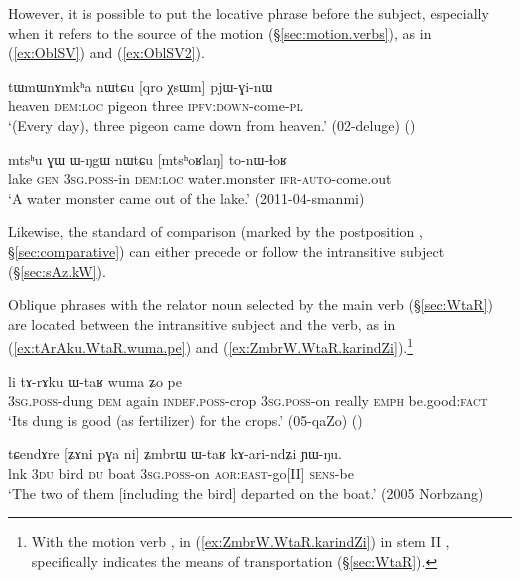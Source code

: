 However, it is possible to put the locative phrase before the subject, especially when it refers to the source of the motion (§\ref{sec:motion.verbs}), as in (\ref{ex:OblSV}) and (\ref{ex:OblSV2}).

\begin{exe}
\ex \label{ex:OblSV}
\gll tɯmɯnɤmkʰa nɯtɕu [qro χsɯm] pjɯ-ɣi-nɯ \\
heaven \textsc{dem}:\textsc{loc} pigeon three \textsc{ipfv}:\textsc{down}-come-\textsc{pl} \\
\glt `(Every day), three pigeon came down from heaven.' (02-deluge)
()
\end{exe}

\begin{exe}
\ex \label{ex:OblSV2}
\gll mtsʰu ɣɯ ɯ-ŋgɯ nɯtɕu [mtsʰoʁlaŋ] to-nɯ-ɬoʁ  \\
lake \textsc{gen} \textsc{3sg}.\textsc{poss}-in \textsc{dem}:\textsc{loc} water.monster \textsc{ifr}-\textsc{auto}-come.out \\
\glt `A water monster came out of the lake.' (2011-04-smanmi)
\end{exe}

Likewise, the standard of comparison (marked by the postposition , §\ref{sec:comparative}) can either precede or follow the intransitive subject (§\ref{sec:sAz.kW}).

Oblique phrases with the relator noun  selected by the main verb (§\ref{sec:WtaR}) are located between the intransitive subject and the verb, as in (\ref{ex:tArAku.WtaR.wuma.pe}) and (\ref{ex:ZmbrW.WtaR.karindZi}).\footnote{
With the motion verb , in (\ref{ex:ZmbrW.WtaR.karindZi}) in stem II ,  specifically indicates the means of transportation (§\ref{sec:WtaR}). }

\begin{exe}
\ex \label{ex:tArAku.WtaR.wuma.pe}
\gll  [ɯ-ɣli nɯ] li tɤ-rɤku ɯ-taʁ wuma ʑo pe \\
\textsc{3sg}.\textsc{poss}-dung \textsc{dem} again \textsc{indef}.\textsc{poss}-crop \textsc{3sg}.\textsc{poss}-on really \textsc{emph} be.good:\textsc{fact} \\
\glt `Its dung is good (as fertilizer) for the crops.' (05-qaZo) ()
\end{exe}

\begin{exe}
\ex \label{ex:ZmbrW.WtaR.karindZi}
\gll tɕendɤre [ʑɤni pɣa ni] ʑmbrɯ ɯ-taʁ kɤ-ari-ndʑi ɲɯ-ŋu. \\
lnk \textsc{3du} bird \textsc{du} boat \textsc{3sg}.\textsc{poss}-on \textsc{aor}:\textsc{east}-go[II] \textsc{sens}-be \\
\glt `The two of them [including the bird] departed on the boat.' (2005 Norbzang)
\end{exe} 

